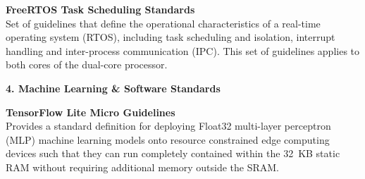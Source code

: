 \medskip
\noindent\textbf{FreeRTOS Task Scheduling Standards}\\
Set of guidelines that define the operational characteristics of a real-time operating system (RTOS), including task scheduling and isolation, interrupt handling and inter-process communication (IPC). This set of guidelines applies to both cores of the dual-core processor.

\vspace{0.6cm}
\noindent\textbf{4. Machine Learning \& Software Standards}

\medskip
\noindent\textbf{TensorFlow Lite Micro Guidelines}\\
Provides a standard definition for deploying Float32 multi-layer perceptron (MLP) machine learning models onto resource constrained edge computing devices such that they can run completely contained within the 32~KB static RAM without requiring additional memory outside the SRAM.
